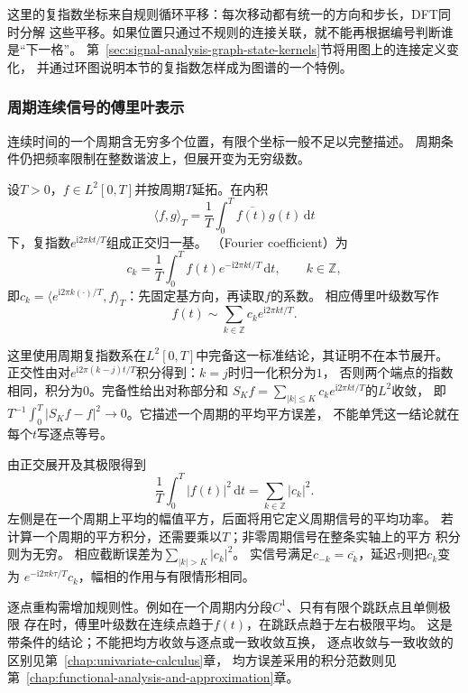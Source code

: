 这里的复指数坐标来自规则循环平移：每次移动都有统一的方向和步长，DFT同时分解
这些平移。如果位置只通过不规则的连接关联，就不能再根据编号判断谁是“下一格”。
第~\ref{sec:signal-analysis-graph-state-kernels}节将用图上的连接定义变化，
并通过环图说明本节的复指数怎样成为图谱的一个特例。

\subsubsection{周期连续信号的傅里叶表示}

连续时间的一个周期含无穷多个位置，有限个坐标一般不足以完整描述。
周期条件仍把频率限制在整数谐波上，但展开变为无穷级数。
\begin{definition}[周期信号的傅里叶系数与级数]
  \label{def:signal-analysis-fourier-series}
  设$T>0$，$f\in L^2[0,T]$并按周期$T$延拓。在内积
  \[
    \langle f,g\rangle_T=\frac1T\int_0^T \overline{f(t)}g(t)\,\mathrm dt
  \]
  下，复指数$e^{\mathrm i2\pi kt/T}$组成正交归一基。
  （Fourier coefficient）为
  \[
    c_k=\frac1T\int_0^T f(t)e^{-\mathrm i2\pi kt/T}\,\mathrm dt,
    \qquad k\in\mathbb Z,
  \]
  即$c_k=\langle e^{\mathrm i2\pi k(\cdot)/T},f\rangle_T$：先固定基方向，再读取$f$的系数。
  相应傅里叶级数写作
  \begin{equation}
    f(t)\sim\sum_{k\in\mathbb Z}c_ke^{\mathrm i2\pi kt/T}.
    \label{eq:signal-analysis-fourier-series}
  \end{equation}
\end{definition}
这里使用周期复指数系在$L^2[0,T]$中完备这一标准结论，其证明不在本节展开。
正交性由对$e^{\mathrm i2\pi(k-j)t/T}$积分得到：$k=j$时归一化积分为$1$，
否则两个端点的指数相同，积分为$0$。完备性给出对称部分和
$S_Kf=\sum_{|k|\leq K}c_ke^{\mathrm i2\pi kt/T}$的$L^2$收敛，
即$T^{-1}\int_0^T|S_Kf-f|^2\to0$。它描述一个周期的平均平方误差，
不能单凭这一结论就在每个$t$写逐点等号。

由正交展开及其极限得到
\begin{equation}
  \frac1T\int_0^T|f(t)|^2\,\mathrm dt
  =\sum_{k\in\mathbb Z}|c_k|^2.
  \label{eq:signal-analysis-continuous-parseval}
\end{equation}
左侧是在一个周期上平均的幅值平方，后面将用它定义周期信号的平均功率。
若计算一个周期的平方积分，还需要乘以$T$；非零周期信号在整条实轴上的平方
积分则为无穷。
相应截断误差为$\sum_{|k|>K}|c_k|^2$。
实信号满足$c_{-k}=\overline{c_k}$，延迟$\tau$则把$c_k$变为
$e^{-\mathrm i2\pi k\tau/T}c_k$，幅相的作用与有限情形相同。

逐点重构需增加规则性。例如在一个周期内分段$C^1$、只有有限个跳跃点且单侧极限
存在时，傅里叶级数在连续点趋于$f(t)$，在跳跃点趋于左右极限平均。
这是带条件的结论；不能把均方收敛与逐点或一致收敛互换，
逐点收敛与一致收敛的区别见第~\ref{chap:univariate-calculus}章，
均方误差采用的积分范数则见第~\ref{chap:functional-analysis-and-approximation}章。

